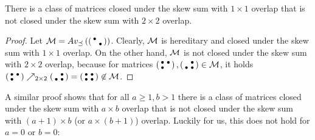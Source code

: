 
\begin{obs}
There is a class of matrices closed under the skew sum with $1\times1$ overlap that is not closed under the skew sum with $2\times2$ overlap.
\end{obs}
\begin{proof}
Let $\mathcal{M}=Av_{\preceq}\left(\left(\begin{smallmatrix}\bullet& \\ &\bullet\end{smallmatrix}\right)\right)$. Clearly, $\mathcal{M}$ is hereditary and closed under the skew sum with $1\times1$ overlap. On the other hand, $\mathcal{M}$ is not closed under the skew sum with $2\times2$ overlap, because for matrices $\left(\begin{smallmatrix}\bullet&\bullet\\\bullet& \end{smallmatrix}\right),\left(\begin{smallmatrix} &\bullet\\\bullet&\bullet\end{smallmatrix}\right)\in\mathcal{M}$, it holds $\left(\begin{smallmatrix}\bullet&\bullet\\\bullet& \end{smallmatrix}\right)\nearrow_{2\times2}\left(\begin{smallmatrix} &\bullet\\\bullet&\bullet\end{smallmatrix}\right)=\left(\begin{smallmatrix}\bullet&\bullet\\\bullet&\bullet\end{smallmatrix}\right)\not\in\mathcal{M}$.
\end{proof}

A similar proof shows that for all $a\geq1,b>1$ there is a class of matrices closed under the skew sum with $a\times b$ overlap that is not closed under the skew sum with $(a+1)\times b$ (or $a\times(b+1)$) overlap. Luckily for us, this does not hold for $a=0$ or $b=0$:

